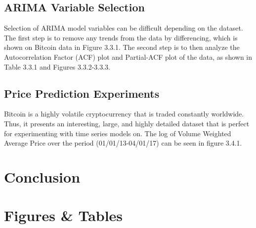 \documentclass[12pt]{article}
\begin{document}
\subsection {ARIMA Variable Selection}
  Selection of ARIMA model variables can be difficult depending on the dataset. The first step is to remove any trends from the data by differencing, which is shown on Bitcoin data in Figure 3.3.1. The second step is to then analyze the Autocorrelation Factor (ACF) plot and Partial-ACF plot of the data, as shown in Table 3.3.1 and Figures 3.3.2-3.3.3.

\subsection {Price Prediction Experiments}
  Bitcoin is a highly volatile cryptocurrency that is traded constantly worldwide. Thus, it presents an interesting, large, and highly detailed dataset that is perfect for experimenting with time series models on. The log of Volume Weighted Average Price over the period (01/01/13-04/01/17) can be seen in figure 3.4.1.

\section {Conclusion}

\section {Figures \& Tables}
\end{document}
